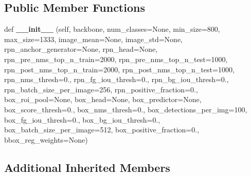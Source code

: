 \subsection*{Public Member Functions}
\begin{DoxyCompactItemize}
\item 
\mbox{\label{classtorchvision_1_1models_1_1detection_1_1faster__rcnn_1_1FasterRCNN_a1ba75f579d1213c11d4ce9196d71e1c6}} 
def {\bfseries \+\_\+\+\_\+init\+\_\+\+\_\+} (self, backbone, num\+\_\+classes=None, min\+\_\+size=800, max\+\_\+size=1333, image\+\_\+mean=None, image\+\_\+std=None, rpn\+\_\+anchor\+\_\+generator=None, rpn\+\_\+head=None, rpn\+\_\+pre\+\_\+nms\+\_\+top\+\_\+n\+\_\+train=2000, rpn\+\_\+pre\+\_\+nms\+\_\+top\+\_\+n\+\_\+test=1000, rpn\+\_\+post\+\_\+nms\+\_\+top\+\_\+n\+\_\+train=2000, rpn\+\_\+post\+\_\+nms\+\_\+top\+\_\+n\+\_\+test=1000, rpn\+\_\+nms\+\_\+thresh=0., rpn\+\_\+fg\+\_\+iou\+\_\+thresh=0., rpn\+\_\+bg\+\_\+iou\+\_\+thresh=0., rpn\+\_\+batch\+\_\+size\+\_\+per\+\_\+image=256, rpn\+\_\+positive\+\_\+fraction=0., box\+\_\+roi\+\_\+pool=None, box\+\_\+head=None, box\+\_\+predictor=None, box\+\_\+score\+\_\+thresh=0., box\+\_\+nms\+\_\+thresh=0., box\+\_\+detections\+\_\+per\+\_\+img=100, box\+\_\+fg\+\_\+iou\+\_\+thresh=0., box\+\_\+bg\+\_\+iou\+\_\+thresh=0., box\+\_\+batch\+\_\+size\+\_\+per\+\_\+image=512, box\+\_\+positive\+\_\+fraction=0., bbox\+\_\+reg\+\_\+weights=None)
\end{DoxyCompactItemize}
\subsection*{Additional Inherited Members}


